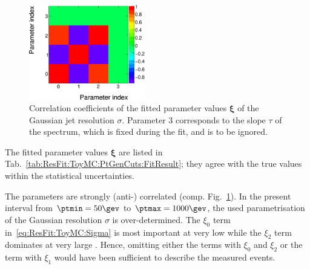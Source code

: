 \begin{figure}[ht]
  \centering
  \includegraphics[width=0.45\textwidth]{figures/resFit_ToyMC_PtGenCuts_Correlations}
  \caption{Correlation coefficients of the fitted parameter values
    $\mathbf{\xi}$ of the Gaussian jet \pt resolution $\sigma$. 
    Parameter $3$ corresponds to the slope $\tau$ of the
    spectrum, which is fixed during the fit, and is to be ignored.}
  \label{fig:ResFit:ToyMC:PtGenCuts:ParCorr}
\end{figure}

The fitted parameter values $\mathbf{\xi}$ are listed in Tab.~\ref{tab:ResFit:ToyMC:PtGenCuts:FitResult};
they agree with the true values within the statistical uncertainties.

The parameters are strongly (anti-) correlated (comp. Fig.~\ref{fig:ResFit:ToyMC:PtGenCuts:ParCorr}).
In the present \pttrue interval from \mbox{$\ptmin = 50\gev$} to \mbox{$\ptmax = 1000\gev$}, the used parametrisation of the Gaussian resolution $\sigma$ is over-determined.
The $\xi_{0}$ term in~\eqref{eq:ResFit:ToyMC:Sigma} is most important at very low \pt while the $\xi_{2}$ term dominates at very large \pt.
Hence, omitting either the terms with $\xi_{0}$ and $\xi_{2}$ or the
term with $\xi_{1}$ would have been sufficient to describe the measured events.

